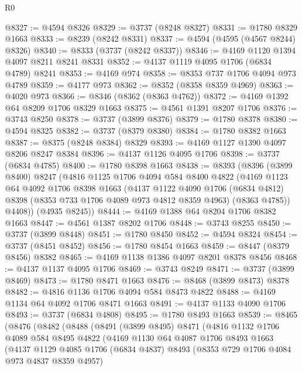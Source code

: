 \begin{lexlean}{R0}
\begin{coremodule}
@8327 := @4594 @8326
@8329 := @3737 (@8248 @8327)
@8331 := @1780 @8329 @1663
@8333 := @8239 (@8242 @8331)
@8337 := @4594 (@4595 (@4567 @8244) @8326)
@8340 := @8333 (@3737 (@8242 @8337))
@8346 := @4169 @1120 @1394 @4097 @8211 @8241 @8331
@8352 := @4137 @1119 @4095 @1706 (@6834 @4789) @8241
@8353 := @4169 @974
@8358 := @8353 @737 @1706 @4094 @973 @4789
@8359 := @4177 @973
@8362 := @8352 (@8358 @8359 @4969)
@8363 := @4020 @973
@8366 := @8346 (@8362 (@8363 @4762))
@8372 := @4169 @1392 @64 @8209 @1706 @8329 @1663
@8375 := @4561 @1391 @8207 @1706
@8376 := @3743 @8250
@8378 := @3737 (@3899 @8376)
@8379 := @1780 @8378
@8380 := @4594 @8325
@8382 := @3737 (@8379 @8380)
@8384 := @1780 @8382 @1663
@8387 := @8375 (@8248 @8384) @8329
@8393 := @4169 @1127 @1390 @4097 @8206 @8247 @8384
@8396 := @4137 @1126 @4095 @1706
@8398 := @3737 (@6834 @4785)
@8400 := @1780 @8398 @1663
@8438 := @8393
    (@8396
      (@3899 @8400)
      @8247
      (@4816
        @1125
        @1706
        @4094
        @584
        @8400
        @4822
        (@4169
          @1123
          @64
          @4092
          @1706
          @8398
          @1663
          (@4137
            @1122
            @4090
            @1706
            (@6834 @4812)
            @8398
            (@8353 @733 @1706 @4089 @973 @4812 @8359 @4963)
            (@8363 @4785))
          @4408))
      (@4935 @8245))
@8444 := @4169 @1388 @64 @8204 @1706 @8382 @1663
@8447 := @4561 @1387 @8202 @1706
@8448 := @3743 @8255
@8450 := @3737 (@3899 @8448)
@8451 := @1780 @8450
@8452 := @4594 @8324
@8454 := @3737 (@8451 @8452)
@8456 := @1780 @8454 @1663
@8459 := @8447 (@8379 @8456) @8382
@8465 := @4169 @1138 @1386 @4097 @8201 @8378 @8456
@8468 := @4137 @1137 @4095 @1706
@8469 := @3743 @8249
@8471 := @3737 (@3899 @8469)
@8473 := @1780 @8471 @1663
@8476 := @8468 (@3899 @8473) @8378
@8482 := @4816 @1136 @1706 @4094 @584 @8473 @4822
@8488 := @4169 @1134 @64 @4092 @1706 @8471 @1663
@8491 := @4137 @1133 @4090 @1706
@8493 := @3737 (@6834 @4808)
@8495 := @1780 @8493 @1663
@8539 := @8465
    (@8476
      (@8482
        (@8488
          (@8491
            (@3899 @8495)
            @8471
            (@4816
              @1132
              @1706
              @4089
              @584
              @8495
              @4822
              (@4169
                @1130
                @64
                @4087
                @1706
                @8493
                @1663
                (@4137
                  @1129
                  @4085
                  @1706
                  (@6834 @4837)
                  @8493
                  (@8353 @729 @1706 @4084 @973 @4837 @8359 @4957)

\end{coremodule}
\end{lexlean}
